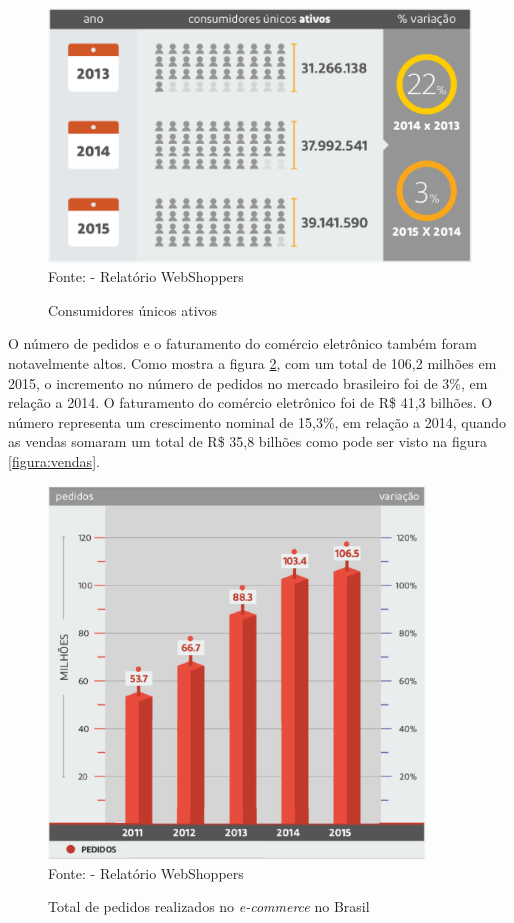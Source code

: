 \documentclass[a4paper,12pt]{monografia}
\begin{document}
\begin{figure}[H]
\centering
\caption{Consumidores únicos ativos}
\centering
\includegraphics[width=12cm]{img/webshoppers/consumidores.eps}\\
\small{Fonte:  - Relatório WebShoppers}
\label{figura:consumidores}
\end{figure}

O número de pedidos e o faturamento do comércio eletrônico também foram notavelmente altos. Como mostra a figura \ref{figura:pedidos}, com um total de 106,2 milhões em 2015, o incremento no número de pedidos no mercado brasileiro foi de 3\%, em relação a 2014. O faturamento do comércio eletrônico foi de R\$ 41,3 bilhões. O número representa um crescimento nominal de 15,3\%, em relação a 2014, quando as vendas somaram um total de R\$ 35,8 bilhões como pode ser visto na figura \ref{figura:vendas}.

\begin{figure}[H]
\centering
\caption{Total de pedidos realizados no \textit{e-commerce} no Brasil}
\centering
\includegraphics[width=10cm]{img/webshoppers/total-pedidos.eps}\\
\small{Fonte:  - Relatório WebShoppers}
\label{figura:pedidos}
\end{figure}
\end{document}
